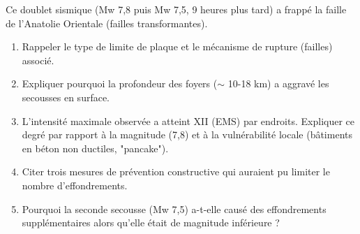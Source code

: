 \documentclass[11pt]{article}
\begin{document}
\begin{exercice}
Ce doublet sismique (Mw 7,8 puis Mw 7,5, 9 heures plus tard) a frappé la faille de l'Anatolie Orientale (failles transformantes).
\begin{enumerate}
    \item Rappeler le type de limite de plaque et le mécanisme de rupture (failles) associé.
    \item Expliquer pourquoi la profondeur des foyers ($\sim$ 10-18 km) a aggravé les secousses en surface.
    \item L'intensité maximale observée a atteint XII (EMS) par endroits. Expliquer ce degré par rapport à la magnitude (7,8) et à la vulnérabilité locale (bâtiments en béton non ductiles, "pancake").
    \item Citer trois mesures de prévention constructive qui auraient pu limiter le nombre d'effondrements.
    \item Pourquoi la seconde secousse (Mw 7,5) a-t-elle causé des effondrements supplémentaires alors qu'elle était de magnitude inférieure ?
\end{enumerate}
\end{exercice}
\end{document}
